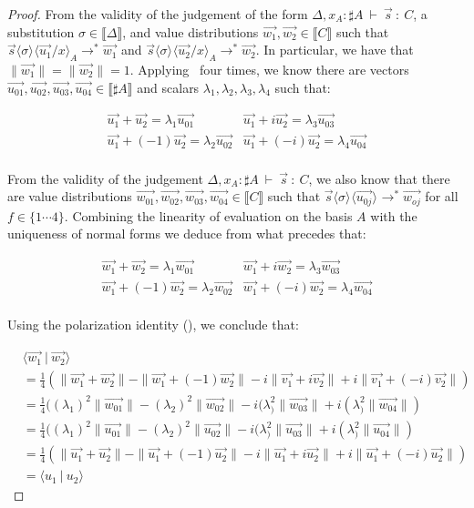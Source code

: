 \documentclass[runningheads,orivec,envcountsame,envcountsect]{llncs}
\newcommand\lra{\longrightarrow}
\newcommand\ansubst[2]{\ensuremath{\langle #1 \rangle_{#2}}}
\def\scal#1#2{\langle{#1}~|~{#2}\rangle}
\def\eval{\lra^*}
\def\sem#1{\llbracket#1\rrbracket}
\def\TYP#1#2#3{#1~{\vdash}~#2~{:}~#3}
\begin{document}
\begin{proof}
    From the validity of the judgement of the form $\TYP{\Delta, x_A:\sharp A}{\vec{s}}{C}$, a substitution $\sigma\in\sem{\Delta}$, and value distributions $\vec{w_1},\vec{w_2}\in\sem{C}$ such that $\vec{s}\ansubst{\sigma}{}\ansubst{\vec{u_1}/x}{A}\eval\vec{w_1}$ and $\vec{s}\ansubst{\sigma}{}\ansubst{\vec{u_2}/x}{A}\eval\vec{w_2}$. In particular, we have that $\|\vec{w_1}\| = \|\vec{w_2}\|=1$. Applying ~four times, we know there are vectors $\vec{u_{01}},\vec{u_{02}},\vec{u_{03}},\vec{u_{04}}\in\sem{\sharp A}$ and scalars $\lambda_1,\lambda_2,\lambda_3,\lambda_4$ such that:
    
    \begin{align*}
        \vec{u_1} + \vec{u_2} = \lambda_1 \vec{u_{01}} & \vec{u_1} + i \vec{u_2} = \lambda_3 \vec{u_{03}} \\
        \vec{u_1} + (-1) \vec{u_2} = \lambda_2 \vec{u_{02}} & \vec{u_1} + (-i) \vec{u_2} = \lambda_4 \vec{u_{04}} \\
    \end{align*}

    From the validity of the judgement  $\TYP{\Delta, x_A:\sharp A}{\vec{s}}{C}$, we also know that there are value distributions $\vec{w_{01}},\vec{w_{02}},\vec{w_{03}},\vec{w_{04}}\in\sem{C}$ such that $\vec{s}\ansubst{\sigma}{}\ansubst{\vec{u_{0j}}}{}\eval\vec{w_{oj}}$ for all $f\in\{1\dotsb 4\}$. Combining the linearity of evaluation on the basis $A$ with the uniqueness of normal forms we deduce from what precedes that:

    \begin{align*}
        \vec{w_1} + \vec{w_2} = \lambda_1 \vec{w_{01}} & \vec{w_1} + i \vec{w_2} = \lambda_3 \vec{w_{03}} \\
        \vec{w_1} + (-1) \vec{w_2} = \lambda_2 \vec{w_{02}} & \vec{w_1} + (-i) \vec{w_2} = \lambda_4 \vec{w_{04}} \\
    \end{align*}

    Using the polarization identity (), we conclude that:

    \begin{align*}
        &\scal{\vec{w_1}}{\vec{w_2}}\\
        &= \frac{1}{4}(\|\vec{w_1}+\vec{w_2}\| - \|\vec{w_1} + (-1)\vec{w_2}\| - i \|\vec{v_1} + i \vec{v_2}\| + i \|\vec{v_1} + (-i) \vec{v_2}\|)\\
        &= \frac{1}{4}((\lambda_1)^2\|\vec{w_{01}}\| - (\lambda_2)^2\|\vec{w_{02}}\| - i (\lambda_)^2 \|\vec{w_{03}}\| + i (\lambda_)^2\|\vec{w_{04}}\|)\\
        &= \frac{1}{4}((\lambda_1)^2\|\vec{u_{01}}\| - (\lambda_2)^2\|\vec{u_{02}}\| - i (\lambda_)^2 \|\vec{u_{03}}\| + i (\lambda_)^2\|\vec{u_{04}}\|)\\
        &= \frac{1}{4}(\|\vec{u_1}+\vec{u_2}\| - \|\vec{u_1} + (-1)\vec{u_2}\| - i \|\vec{u_1} + i \vec{u_2}\| + i \|\vec{u_1} + (-i) \vec{u_2}\|)\\
        &=\scal{u_1}{u_2}
    \end{align*}

\end{proof}
\end{document}

